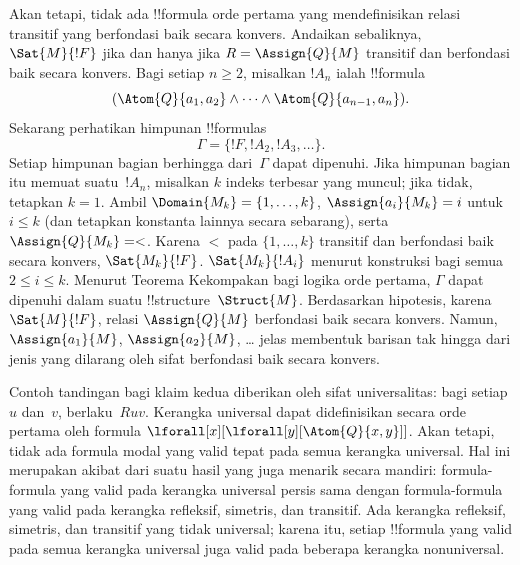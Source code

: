 \documentclass[../../../include/open-logic-section]{subfiles}
\begin{document}
Akan tetapi, tidak ada !!{formula} orde pertama yang mendefinisikan relasi
transitif yang berfondasi baik secara konvers. Andaikan sebaliknya,
$\Sat{M}{!F}$ jika dan hanya jika $R=\Assign{Q}{M}$ transitif dan berfondasi
baik secara konvers. Bagi setiap $n\geq 2$, misalkan $!A_n$ ialah !!{formula}
\[
(\Atom{Q}{a_1,a_2} \land \dots \land
    \Atom{Q}{a_{n-1},a_{n}}).
\]
Sekarang perhatikan himpunan !!{formula}s
\[
\Gamma=\{!F,!A_2,!A_3,\dots\}.
\]
Setiap himpunan bagian berhingga dari~$\Gamma$ dapat dipenuhi. Jika himpunan
bagian itu memuat suatu~$!A_n$, misalkan $k$ indeks terbesar yang muncul;
jika tidak, tetapkan $k=1$. Ambil $\Domain{M_k}=\{1,\dots,k\}$,
$\Assign{a_i}{M_k}=i$ untuk $i\leq k$ (dan tetapkan konstanta lainnya secara
sebarang), serta $\Assign{Q}{M_k}=<$. Karena $<$ pada $\{1,\dots,k\}$
transitif dan berfondasi baik secara konvers, $\Sat{M_k}{!F}$.
$\Sat{M_k}{!A_i}$ menurut konstruksi bagi semua $2\leq i\leq k$. Menurut
Teorema Kekompakan bagi logika orde pertama, $\Gamma$ dapat dipenuhi dalam
suatu !!{structure}~$\Struct{M}$. Berdasarkan hipotesis, karena
$\Sat{M}{!F}$, relasi $\Assign{Q}{M}$ berfondasi baik secara konvers. Namun,
$\Assign{a_1}{M}$, $\Assign{a_2}{M}$, \dots{} jelas membentuk barisan tak
hingga dari jenis yang dilarang oleh sifat berfondasi baik secara konvers.

Contoh tandingan bagi klaim kedua diberikan oleh sifat universalitas: bagi
setiap $u$ dan~$v$, berlaku~$Ruv$. Kerangka universal dapat didefinisikan
secara orde pertama oleh formula
$\lforall[x][\lforall[y][\Atom{Q}{x,y}]]$. Akan tetapi, tidak ada formula
modal yang valid tepat pada semua kerangka universal. Hal ini merupakan akibat
dari suatu hasil yang juga menarik secara mandiri: formula-formula yang valid
pada kerangka universal persis sama dengan formula-formula yang valid pada
kerangka refleksif, simetris, dan transitif. Ada kerangka refleksif, simetris,
dan transitif yang tidak universal; karena itu, setiap !!{formula} yang valid
pada semua kerangka universal juga valid pada beberapa kerangka nonuniversal.
\end{document}
